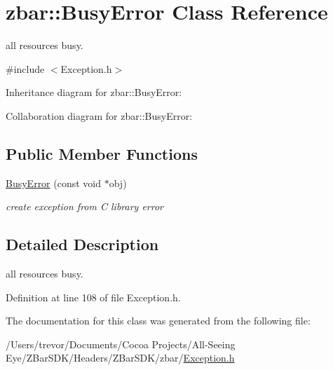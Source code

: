 \hypertarget{classzbar_1_1_busy_error}{
\section{zbar::BusyError Class Reference}
\label{classzbar_1_1_busy_error}
}


all resources busy.  




{\ttfamily \#include $<$Exception.h$>$}



Inheritance diagram for zbar::BusyError:


Collaboration diagram for zbar::BusyError:
\subsection*{Public Member Functions}
\begin{DoxyCompactItemize}
\item 
\hypertarget{classzbar_1_1_busy_error_a46ca8fbd0b0850d5f513e1a91f0386e0}{
\hyperlink{classzbar_1_1_busy_error_a46ca8fbd0b0850d5f513e1a91f0386e0}{BusyError} (const void $\ast$obj)}
\label{classzbar_1_1_busy_error_a46ca8fbd0b0850d5f513e1a91f0386e0}

\begin{DoxyCompactList}\small\item\em create exception from C library error \end{DoxyCompactList}\end{DoxyCompactItemize}


\subsection{Detailed Description}
all resources busy. 

Definition at line 108 of file Exception.h.



The documentation for this class was generated from the following file:\begin{DoxyCompactItemize}
\item 
/Users/trevor/Documents/Cocoa Projects/All-\/Seeing Eye/ZBarSDK/Headers/ZBarSDK/zbar/\hyperlink{_exception_8h}{Exception.h}\end{DoxyCompactItemize}
